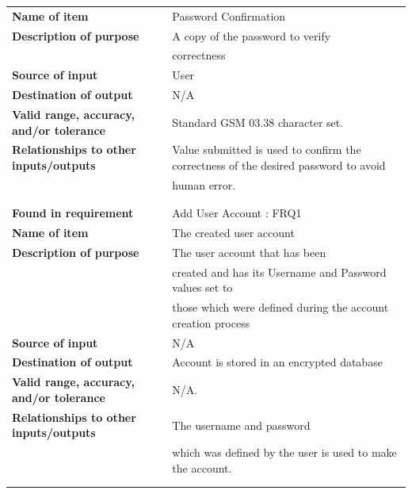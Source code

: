 \begin{tabular}{ll}
\textbf{Name of item}&Password Confirmation\\
\textbf{Description of purpose}&A copy of the password to verify \\&correctness\\
\textbf{Source of input}&User\\
\textbf{Destination of output}&N/A\\
\textbf{Valid range, accuracy, and/or tolerance}&Standard GSM 03.38 character set.\\
\textbf{Relationships to other inputs/outputs}&Value submitted is used to confirm the correctness of the desired password to avoid\\& human error.\\
&\\
&\\
\textbf{Found in requirement}&Add User Account : FRQ1\\
\textbf{Name of item}&The created user account\\
\textbf{Description of purpose}&The user account that has been\\& created and has its Username and Password values set to\\& those which were defined during the account creation process \\
\textbf{Source of input}&N/A\\
\textbf{Destination of output}&Account is stored in an encrypted database\\
\textbf{Valid range, accuracy, and/or tolerance}&N/A.\\
\textbf{Relationships to other inputs/outputs}&The username and password\\& which was defined by the user is used to make the account.\\
&\\
&\\
\end{tabular}
\newpage
